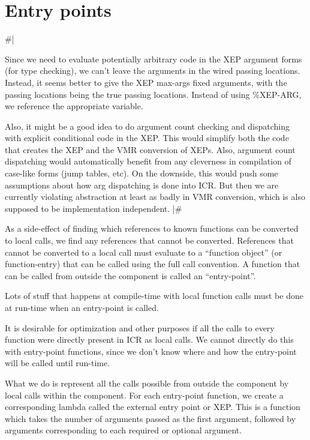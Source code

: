 
\section{Entry points}

\#|

Since we need to evaluate potentially arbitrary code in the XEP argument forms
(for type checking), we can't leave the arguments in the wired passing
locations.  Instead, it seems better to give the XEP max-args fixed arguments,
with the passing locations being the true passing locations.  Instead of using
\%XEP-ARG, we reference the appropriate variable.

Also, it might be a good idea to do argument count checking and dispatching
with explicit conditional code in the XEP.  This would simplify both the code
that creates the XEP and the VMR conversion of XEPs.  Also, argument count
dispatching would automatically benefit from any cleverness in compilation of
case-like forms (jump tables, etc).  On the downside, this would push some
assumptions about how arg dispatching is done into ICR.  But then we are
currently violating abstraction at least as badly in VMR conversion, which is
also supposed to be implementation independent.
|\#

As a side-effect of finding which references to known functions can be
converted to local calls, we find any references that cannot be converted.
References that cannot be converted to a local call must evaluate to a
``function object'' (or function-entry) that can be called using the full call
convention.  A function that can be called from outside the component is called
an ``entry-point''.

Lots of stuff that happens at compile-time with local function calls must be
done at run-time when an entry-point is called.

It is desirable for optimization and other purposes if all the calls to every
function were directly present in ICR as local calls.  We cannot directly do
this with entry-point functions, since we don't know where and how the
entry-point will be called until run-time.

What we do is represent all the calls possible from outside the component by
local calls within the component.  For each entry-point function, we create a
corresponding lambda called the external entry point or XEP.  This is a
function which takes the number of arguments passed as the first argument,
followed by arguments corresponding to each required or optional argument.

